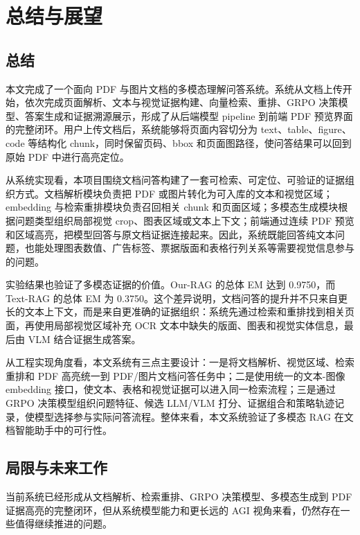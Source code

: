 \chapter{总结与展望}

\section{总结}

本文完成了一个面向 PDF 与图片文档的多模态理解问答系统。系统从文档上传开始，依次完成页面解析、文本与视觉证据构建、向量检索、重排、GRPO 决策模型、答案生成和证据溯源展示，形成了从后端模型 pipeline 到前端 PDF 预览界面的完整闭环。用户上传文档后，系统能够将页面内容切分为 text、table、figure、code 等结构化 chunk，同时保留页码、bbox 和页面图路径，使问答结果可以回到原始 PDF 中进行高亮定位。

从系统实现看，本项目围绕文档问答构建了一套可检索、可定位、可验证的证据组织方式。文档解析模块负责把 PDF 或图片转化为可入库的文本和视觉区域；embedding 与检索重排模块负责召回相关 chunk 和页面区域；多模态生成模块根据问题类型组织局部视觉 crop、图表区域或文本上下文；前端通过连续 PDF 预览和区域高亮，把模型回答与原文档证据连接起来。因此，系统既能回答纯文本问题，也能处理图表数值、广告标签、票据版面和表格行列关系等需要视觉信息参与的问题。

实验结果也验证了多模态证据的价值。Our-RAG 的总体 EM 达到 0.9750，而 Text-RAG 的总体 EM 为 0.3750。这个差异说明，文档问答的提升并不只来自更长的文本上下文，而是来自更准确的证据组织：系统先通过检索和重排找到相关页面，再使用局部视觉区域补充 OCR 文本中缺失的版面、图表和视觉实体信息，最后由 VLM 结合证据生成答案。

从工程实现角度看，本文系统有三点主要设计：一是将文档解析、视觉区域、检索重排和 PDF 高亮统一到 PDF/图片文档问答任务中；二是使用统一的文本-图像 embedding 接口，使文本、表格和视觉证据可以进入同一检索流程；三是通过 GRPO 决策模型组织问题特征、候选 LLM/VLM 打分、证据组合和策略轨迹记录，使模型选择参与实际问答流程。整体来看，本文系统验证了多模态 RAG 在文档智能助手中的可行性。

\section{局限与未来工作}

当前系统已经形成从文档解析、检索重排、GRPO 决策模型、多模态生成到 PDF 证据高亮的完整闭环，但从系统模型能力和更长远的 AGI 视角来看，仍然存在一些值得继续推进的问题。

